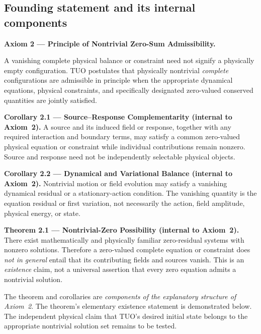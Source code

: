 \documentclass[11pt,a4paper]{article}
\theoremstyle{tmon}
\theoremstyle{definition}
\begin{document}
\subsection{Founding statement and its internal components}
\begin{axiombox}
\textbf{Axiom 2 --- Principle of Nontrivial Zero-Sum Admissibility.}

A vanishing complete physical balance or constraint need not signify a physically empty configuration. TUO postulates that physically nontrivial \emph{complete} configurations are admissible in principle when the appropriate dynamical equations, physical constraints, and specifically designated zero-valued conserved quantities are jointly satisfied.

\medskip
\textbf{Corollary 2.1 --- Source--Response Complementarity (internal to Axiom~2).} A source and its induced field or response, together with any required interaction and boundary terms, may satisfy a common zero-valued physical equation or constraint while individual contributions remain nonzero. Source and response need not be independently selectable physical objects.

\medskip
\textbf{Corollary 2.2 --- Dynamical and Variational Balance (internal to Axiom~2).} Nontrivial motion or field evolution may satisfy a vanishing dynamical residual or a stationary-action condition. The vanishing quantity is the equation residual or first variation, not necessarily the action, field amplitude, physical energy, or state.

\medskip
\textbf{Theorem 2.1 --- Nontrivial-Zero Possibility (internal to Axiom~2).} There exist mathematically and physically familiar zero-residual systems with nonzero solutions. Therefore a zero-valued complete equation or constraint does \emph{not in general} entail that its contributing fields and sources vanish. This is an \emph{existence} claim, not a universal assertion that every zero equation admits a nontrivial solution.
\end{axiombox}

The theorem and corollaries are \emph{components of the explanatory structure of Axiom~2}. The theorem's elementary existence statement is demonstrated below. The independent physical claim that TUO's desired initial state belongs to the appropriate nontrivial solution set remains to be tested.
\end{document}
